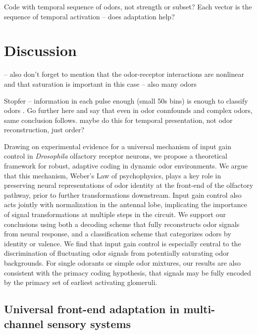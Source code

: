 {\color{blue} Code with temporal sequence of odors, not strength or subset? Each vector is  the sequence of temporal activation -- does adaptation help? }




\section{Discussion}

{\color {blue}-- also don't forget to mention that the odor-receptor  interactions are nonlinear and that saturation is important in this case -- also many odors}

Stopfer -- information in each pulse enough (small 50s bins) is enough to classify odors . Go further here and say that even in odor connfounds and complex odors, same conclusion follows. maybe do this for temporal presentation, not odor reconstruction, just order?

Drawing on experimental evidence for a universal mechanism of input gain control in \textit{Drosophila} olfactory receptor neurons, we propose a theoretical framework for robust, adaptive coding in dynamic odor environments. We argue that this mechanism, Weber's Law of psychophysics, plays a key role in preserving neural representations of odor identity at the front-end of the olfactory pathway, prior to further transformations downstream. Input gain control also acts jointly with normalization in the antennal lobe, implicating the importance of signal transformations at multiple steps in the circuit. We support our conclusions using both a decoding scheme that fully reconstructs odor signals from neural response, and a classification scheme that categorizes odors by identity or valence. We find that input gain control is especially central to the discrimination of fluctuating odor signals from potentially saturating odor backgrounds. For single odorants or simple odor mixtures, our results are also consistent with the primacy coding hypothesis, that signals may be fully encoded by the primacy set of earliest activating glomeruli. %

\subsection{Universal front-end adaptation in multi-channel sensory systems}

